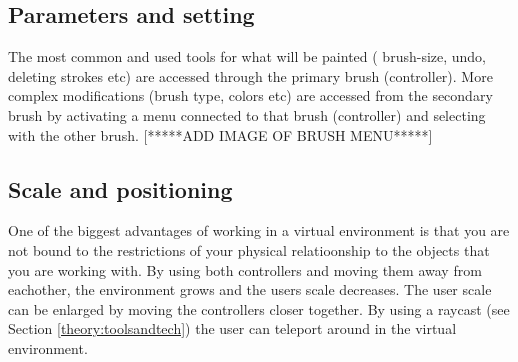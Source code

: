 \subsection{Parameters and setting}
The most common and used tools for what will be painted ( brush-size, undo, deleting strokes etc) are accessed through the primary brush (controller). More complex modifications (brush type, colors etc) are accessed from the secondary brush by activating a menu connected to that brush (controller) and selecting with the other brush.
[*****ADD IMAGE OF BRUSH MENU*****]
\subsection{Scale and positioning}
One of the biggest advantages of working in a virtual environment is that you are not bound to the restrictions of your physical relatioonship to the objects that you are working with. By using both controllers and moving them away from eachother, the environment grows and the users scale decreases. The user scale can be enlarged by moving the controllers closer together.
By using a raycast (see Section \ref{theory:toolsandtech}) the user can teleport around in the virtual environment.

